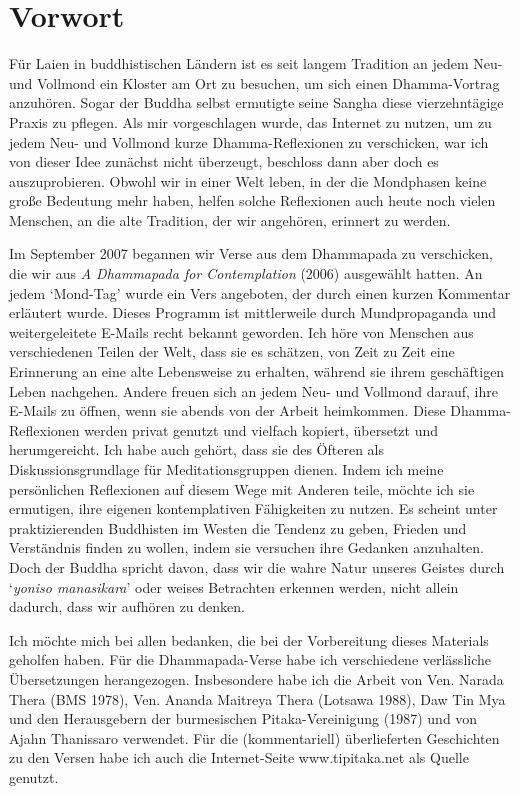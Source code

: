 \chapter{Vorwort}

Für Laien in buddhistischen Ländern ist es seit langem Tradition an
jedem Neu- und Vollmond ein Kloster am Ort zu besuchen, um sich einen
Dhamma-Vortrag anzuhören. Sogar der Buddha selbst ermutigte seine Sangha
diese vierzehntägige Praxis zu pflegen. Als mir vorgeschlagen wurde, das
Internet zu nutzen, um zu jedem Neu- und Vollmond kurze
Dhamma-Reflexionen zu verschicken, war ich von dieser Idee zunächst
nicht überzeugt, beschloss dann aber doch es auszuprobieren. Obwohl wir
in einer Welt leben, in der die Mondphasen keine große Bedeutung mehr
haben, helfen solche Reflexionen auch heute noch vielen Menschen, an die
alte Tradition, der wir angehören, erinnert zu werden.

Im September 2007 begannen wir Verse aus dem Dhammapada zu verschicken,
die wir aus \emph{A Dhammapada for Contemplation} (2006) ausgewählt hatten. An
jedem `Mond-Tag' wurde ein Vers angeboten, der durch einen kurzen
Kommentar erläutert wurde. Dieses Programm ist mittlerweile durch
Mundpropaganda und weitergeleitete E-Mails recht bekannt geworden. Ich
höre von Menschen aus verschiedenen Teilen der Welt, dass sie es
schätzen, von Zeit zu Zeit eine Erinnerung an eine alte Lebensweise zu
erhalten, während sie ihrem geschäftigen Leben nachgehen. Andere freuen
sich an jedem Neu- und Vollmond darauf, ihre E-Mails zu öffnen, wenn sie
abends von der Arbeit heimkommen. Diese Dhamma-Reflexionen werden privat
genutzt und vielfach kopiert, übersetzt und herumgereicht. Ich habe auch
gehört, dass sie des Öfteren als Diskussionsgrundlage für
Meditationsgruppen dienen. Indem ich meine persönlichen Reflexionen auf
diesem Wege mit Anderen teile, möchte ich sie ermutigen, ihre eigenen
kontemplativen Fähigkeiten zu nutzen. Es scheint unter praktizierenden
Buddhisten im Westen die Tendenz zu geben, Frieden und Verständnis
finden zu wollen, indem sie versuchen ihre Gedanken anzuhalten. Doch der
Buddha spricht davon, dass wir die wahre Natur unseres Geistes durch
`\emph{yoniso manasikara}' oder weises Betrachten erkennen werden, nicht allein
dadurch, dass wir aufhören zu denken.

Ich möchte mich bei allen bedanken, die bei der Vorbereitung dieses
Materials geholfen haben. Für die Dhammapada-Verse habe ich verschiedene
verlässliche Übersetzungen herangezogen. Insbesondere habe ich die
Arbeit von Ven. Narada Thera (BMS 1978), Ven. Ananda Maitreya Thera
(Lotsawa 1988), Daw Tin Mya und den Herausgebern der burmesischen
Pitaka-Vereinigung (1987) und von Ajahn Thanissaro verwendet. Für die
(kommentariell) überlieferten Geschichten zu den Versen habe ich auch
die Internet-Seite www.tipitaka.net als Quelle genutzt.

